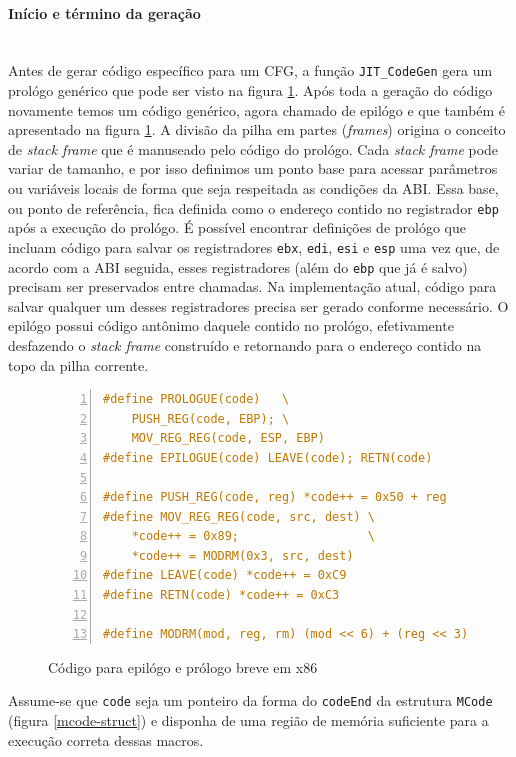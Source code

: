 \paragraph{Início e término da geração}
\quad \\
Antes de gerar código específico para um CFG, a função
\verb!JIT_CodeGen! gera um prológo genérico que pode ser visto na
figura \ref{prologo-epilogo}. Após toda a geração do código novamente
temos um código genérico, agora chamado de epilógo e que também é
apresentado na figura \ref{prologo-epilogo}. A divisão da pilha em
partes (\textit{frames}) origina o conceito de \textit{stack frame}
que é manuseado pelo código do prológo. Cada \textit{stack frame} pode
variar de tamanho, e por isso definimos um ponto base para acessar
parâmetros ou variáveis locais de forma que seja respeitada as
condições da ABI. Essa base, ou ponto de referência, fica definida como
o endereço contido no registrador \verb!ebp! após a execução do
prológo. É possível encontrar definições de prológo que incluam código
para salvar os registradores \verb!ebx!, \verb!edi!, \verb!esi!
e \verb!esp! uma vez que, de acordo com a ABI seguida, esses
registradores (além do \verb!ebp! que já é salvo) precisam ser
preservados entre chamadas. Na
implementação atual, código para salvar qualquer um desses
registradores precisa ser gerado conforme necessário. O epilógo possui
código antônimo daquele contido no prológo, efetivamente desfazendo o
\textit{stack frame} construído e retornando para o endereço contido
na topo da pilha corrente.

\begin{figure}[h]
  \centering
  \begin{lstlisting}[language=C, numbers=left]
#define PROLOGUE(code)   \
    PUSH_REG(code, EBP); \
    MOV_REG_REG(code, ESP, EBP)
#define EPILOGUE(code) LEAVE(code); RETN(code)

#define PUSH_REG(code, reg) *code++ = 0x50 + reg
#define MOV_REG_REG(code, src, dest) \
    *code++ = 0x89;                  \
    *code++ = MODRM(0x3, src, dest)
#define LEAVE(code) *code++ = 0xC9
#define RETN(code) *code++ = 0xC3

#define MODRM(mod, reg, rm) (mod << 6) + (reg << 3) + rm
  \end{lstlisting}
  \caption{Código para epilógo e prólogo breve em x86\label{prologo-epilogo}}
\end{figure}

Assume-se que \verb!code! seja um ponteiro da forma do \verb!codeEnd!
da estrutura \verb!MCode! (figura \ref{mcode-struct}) e disponha de
uma região de memória suficiente para a execução correta dessas macros.

